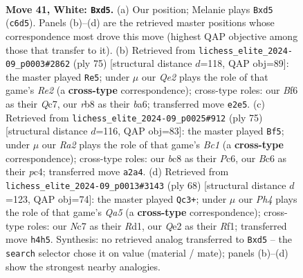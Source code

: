 \documentclass[11pt]{article}
\begin{document}
\clearpage

\begin{figure}[p]\centering
\begin{subfigure}{0.46\textwidth}\centering
\resizebox{\linewidth}{!}{%
\newchessgame
\chessboard[
  setfen={1rb2r2/p1N2p1k/1pB2Bp1/2qp4/7P/1P4p1/R1PNQP2/R5K1 w - - 1 41},
  showmover=false,
  pgfstyle=straightmove, color=movearrow, markmove={c6-d5}
]}
\caption{}
\end{subfigure}\hfill
\begin{subfigure}{0.46\textwidth}\centering
\resizebox{\linewidth}{!}{%
\newchessgame
\chessboard[
  setfen={3r2k1/2q1rp2/B7/1PP3pp/2Qpp3/2n4P/5PP1/2R1R1K1 b - - 0 38},
  showmover=false,
  pgfstyle=straightmove, color=movearrow, markmove={e7-e5}
]}
\caption{}
\end{subfigure}
\\[4pt]
\begin{subfigure}{0.46\textwidth}\centering
\resizebox{\linewidth}{!}{%
\newchessgame
\chessboard[
  setfen={1rb2rk1/5p1p/2p2Pp1/4p3/pqP2n2/1P3PQ1/P6P/2BRRB1K b - - 0 38},
  showmover=false,
  pgfstyle=straightmove, color=movearrow, markmove={c8-f5}
]}
\caption{}
\end{subfigure}\hfill
\begin{subfigure}{0.46\textwidth}\centering
\resizebox{\linewidth}{!}{%
\newchessgame
\chessboard[
  setfen={7k/pp3r1p/2p3rB/Q1Pp1qp1/4bP2/7P/PP5K/3R1R2 w - - 0 35},
  showmover=false,
  pgfstyle=straightmove, color=movearrow, markmove={a5-c3}
]}
\caption{}
\end{subfigure}
\caption{\textbf{Move 41, White: \texttt{Bxd5}.} (a) Our position; Melanie plays \texttt{Bxd5} (\texttt{c6d5}). Panels (b)--(d) are the retrieved master positions whose correspondence most drove this move (highest QAP objective among those that transfer to it). (b) Retrieved from \texttt{lichess\_elite\_2024-09\_p0003\#2862} (ply 75) [structural distance $d$=118, QAP obj=89]: the master played \texttt{Re5}; under $\mu$ our \emph{Qe2} plays the role of that game's \emph{Re2} (a \textbf{cross-type} correspondence); cross-type roles: our \emph{B}f6 as their \emph{Q}c7, our \emph{r}b8 as their \emph{b}a6; transferred move \texttt{e2e5}. (c) Retrieved from \texttt{lichess\_elite\_2024-09\_p0025\#912} (ply 75) [structural distance $d$=116, QAP obj=83]: the master played \texttt{Bf5}; under $\mu$ our \emph{Ra2} plays the role of that game's \emph{Bc1} (a \textbf{cross-type} correspondence); cross-type roles: our \emph{b}c8 as their \emph{P}c6, our \emph{B}c6 as their \emph{p}c4; transferred move \texttt{a2a4}. (d) Retrieved from \texttt{lichess\_elite\_2024-09\_p0013\#3143} (ply 68) [structural distance $d$=123, QAP obj=74]: the master played \texttt{Qc3+}; under $\mu$ our \emph{Ph4} plays the role of that game's \emph{Qa5} (a \textbf{cross-type} correspondence); cross-type roles: our \emph{N}c7 as their \emph{R}d1, our \emph{Q}e2 as their \emph{R}f1; transferred move \texttt{h4h5}. Synthesis: no retrieved analog transferred to \texttt{Bxd5} -- the \texttt{search} selector chose it on value (material / mate); panels (b)--(d) show the strongest nearby analogies.}
\label{fig:thought-m80}
\end{figure}
\end{document}
